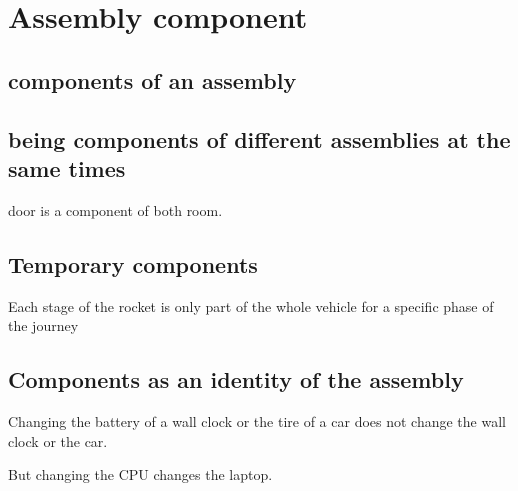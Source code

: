 \chapter{Assembly component}

\section{components of an assembly}






\section{being components of different assemblies at the same times}

door is a component of both room.

\section{Temporary components}

Each stage of the rocket is only part of the whole vehicle for a specific phase of the journey

\section {Components as an identity of the assembly}

Changing the battery of a wall clock or the tire of a car does not change the wall clock or the car.

But changing the CPU changes the laptop. 








